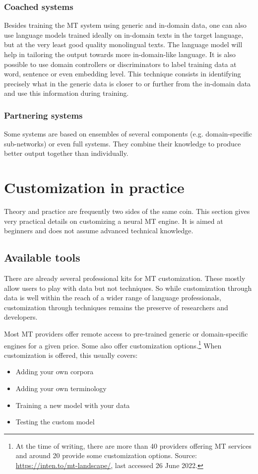\documentclass[output=paper]{langscibook}
\begin{document}
\subsubsection{Coached systems} 
Besides training the MT system using generic and in-domain data, one can also use language models trained ideally on in-domain texts in the target language, but at the very least good quality monolingual texts. The language model will help in tailoring the output towards more in-domain-like language. 
It is also possible to use  domain controllers or discriminators to label training data at word, sentence or even embedding level. This technique consists in identifying precisely what in the generic data is closer to or further from the in-domain data and use this information during training.

\subsubsection{Partnering systems}
Some systems are based on ensembles of several components (e.g. domain-spe\-cif\-ic sub-networks) or even full systems. They combine their knowledge to produce better output together than individually. 

\section{Customization in practice}

Theory and practice are frequently two sides of the same coin. This section gives very practical details on customizing a neural MT engine. It is aimed at beginners and does not assume advanced technical knowledge. 

\subsection{Available tools}

There are already several professional kits for MT customization. These mostly allow users to play with data but not techniques. So while customization through data is well within the reach of a wider range of language professionals, customization through techniques remains the preserve of researchers and developers.

Most MT providers offer remote access to pre-trained generic or domain-spe\-cif\-ic engines for a given price. Some also offer customization options.\footnote{At the time of writing, there are more than 40 providers offering MT services and around 20 provide some customization options. Source: \url{https://inten.to/mt-landscape/}, last accessed 26 June 2022.} When customization is offered, this usually covers: 
\begin{itemize}
\item Adding your own corpora
\item Adding your own terminology
\item Training a new model with your data
\item Testing the custom model
\end{itemize}
\end{document}
